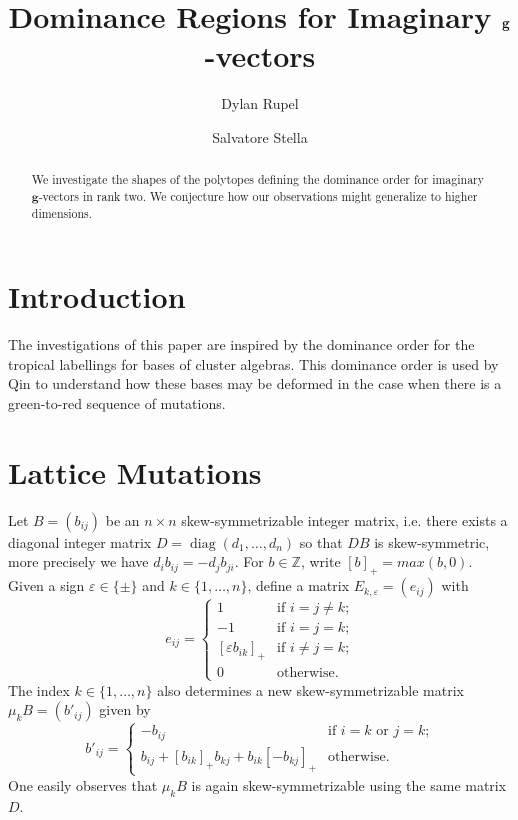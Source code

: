 \documentclass{amsart}
\title{Dominance Regions for Imaginary $\bfg$-vectors}
\author{Dylan Rupel}
\author{Salvatore Stella}
\numberwithin{theorem}{section}
\newcommand{\bfg}{\mathbf{g}}
\newcommand{\ZZ}{\mathbb{Z}}
\newcommand{\diag}{\operatorname{diag}}
\begin{document}
  \begin{abstract}
    We investigate the shapes of the polytopes defining the dominance order for imaginary $\bfg$-vectors in rank two.
    We conjecture how our observations might generalize to higher dimensions.
  \end{abstract}
  \maketitle

  \section{Introduction}
  The investigations of this paper are inspired by the dominance order for the tropical labellings for bases of cluster algebras.
  This dominance order is used by Qin to understand how these bases may be deformed in the case when there is a green-to-red sequence of mutations.

  \section{Lattice Mutations}
  Let $B=(b_{ij})$ be an $n\times n$ skew-symmetrizable integer matrix, i.e. there exists a diagonal integer matrix $D=\diag(d_1,\ldots,d_n)$ so that $DB$ is skew-symmetric, more precisely we have $d_i b_{ij}=-d_j b_{ji}$.
  For $b\in\ZZ$, write $[b]_+=max(b,0)$.
  Given a sign $\varepsilon\in\{\pm\}$ and $k\in\{1,\ldots,n\}$, define a matrix $E_{k,\varepsilon}=(e_{ij})$ with
  \begin{equation}
    \label{eq:mutation matrix}
    e_{ij}=\begin{cases} 1 & \text{if $i=j\ne k$;}\\ -1 & \text{if $i=j=k$;}\\ [\varepsilon b_{ik}]_+ & \text{if $i\ne j=k$;}\\ 0 & \text{otherwise.} \end{cases}
  \end{equation}
  The index $k\in\{1,\ldots,n\}$ also determines a new skew-symmetrizable matrix $\mu_kB=(b'_{ij})$ given by
  \[ b'_{ij}=\begin{cases} -b_{ij} & \text{if $i=k$ or $j=k$;}\\ b_{ij}+[b_{ik}]_+b_{kj}+b_{ik}[-b_{kj}]_+ & \text{otherwise.} \end{cases} \]
  One easily observes that $\mu_k B$ is again skew-symmetrizable using the same matrix $D$.
\end{document}
